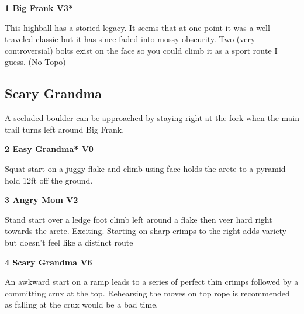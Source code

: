 \begin{multicols}{2}
			\needspace{1.5cm}
\label{rt:Big Frank}
\colorbox{green!20}{
\parbox{0.95\linewidth}{
\textbf{
1 Big Frank V3*  
}}}

			\begin{adjustwidth}{0.5cm}{}			
			This highball has a storied legacy. It seems that at one point it was a well traveled classic but it has since faded into mossy obscurity. Two (very controversial) bolts exist on the face so you could climb it as a sport route I guess. (No Topo)
			\end{adjustwidth}
			
			
		


		\needspace{1.5cm}
		\subsection*{Scary Grandma}\label{bf:Scary Grandma}
		A secluded boulder can be approached by staying right at the fork when the main trail turns left around Big Frank.\\
	
		
			
			\needspace{1.5cm}
\label{rt:Easy Grandma}
\colorbox{green!20}{
\parbox{0.95\linewidth}{
\textbf{
2 Easy Grandma* V0  
}}}

			\begin{adjustwidth}{0.5cm}{}			
			Squat start on a juggy flake and climb using face holds the arete to a pyramid hold 12ft off the ground.
			\end{adjustwidth}
			
			
			
			\needspace{1.5cm}
\label{rt:Angry Mom}
\colorbox{green!20}{
\parbox{0.95\linewidth}{
\textbf{
3 Angry Mom V2  \warn
}}}

			\begin{adjustwidth}{0.5cm}{}			
			Stand start over a ledge foot climb left around a flake then veer hard right towards the arete. Exciting. Starting on sharp crimps to the right adds variety but doesn't feel like a distinct route
			\end{adjustwidth}
			
			


			\needspace{1.5cm}
\label{rt:Scary Grandma}
\colorbox{RoyalBlue!20}{
\parbox{0.95\linewidth}{
\textbf{
4 Scary Grandma V6  \warn\warn
}}}

			\begin{adjustwidth}{0.5cm}{}			
			An awkward start on a ramp leads to a series of perfect thin crimps followed by a committing crux at the top. Rehearsing the moves on top rope is recommended as falling at the crux would be a bad time.
			\end{adjustwidth}
			
			
		
	

\end{multicols}
\clearpage